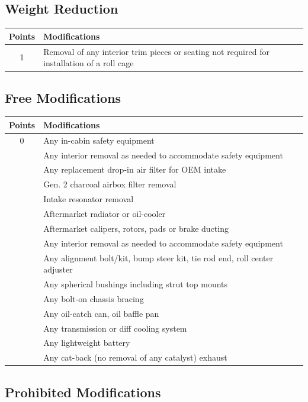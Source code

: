 \documentclass{article}
\newenvironment{legallist}{
    \begin{enumerate}[label*=\arabic*.]
}{
    \end{enumerate}
}
\newenvironment{mods}{
    \begin{longtable}{c p{6in}}
    \toprule
    \textbf{Points} & \textbf{Modifications} \\
    \midrule
}{
    \bottomrule
    \end{longtable}
}
\begin{document}
\begin{legallist}
			\subsection*{Weight Reduction}
						
			\begin{mods}
				1 & Removal of any interior trim pieces or seating not required for installation of a roll cage \\
			\end{mods}
						
			\subsection*{Free Modifications}
						
			\begin{mods}
				0 & Any in-cabin safety equipment \\
				& Any interior removal as needed to accommodate safety equipment \\
				& Any replacement drop-in air filter for OEM intake \\
				& Gen. 2 charcoal airbox filter removal \\
				& Intake resonator removal \\ 
				& Aftermarket radiator or oil-cooler \\
				& Aftermarket calipers, rotors, pads or brake ducting \\
				& Any interior removal as needed to accommodate safety equipment \\
				& Any alignment bolt/kit, bump steer kit, tie rod end, roll center adjuster \\
				& Any spherical bushings including strut top mounts \\
				& Any bolt-on chassis bracing \\
				& Any oil-catch can, oil baffle pan \\
				& Any transmission or diff cooling system \\
				& Any lightweight battery \\ 
				& Any cat-back (no removal of any catalyst) exhaust\\
			\end{mods}
						
			\subsection*{Prohibited Modifications}
						

\end{legallist}
\end{document}
